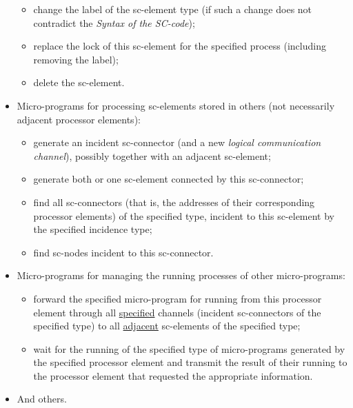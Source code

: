 \documentclass{article}
\begin{document}
\begin{multicols}{2}
\begin{itemize}
\begin{itemize}
			\item change the label of the sc-element type (if such a change does not contradict the \textit{Syntax of the SC-code});
			
			\item replace the lock of this sc-element for the specified	process (including removing the label);
			
			\item delete the sc-element.
		\end{itemize}
		
		\item Micro-programs for processing sc-elements stored in others (not necessarily adjacent processor elements):
		
		\begin{itemize}
			\item generate an incident sc-connector (and a new \textit{logical communication channel}), possibly together with an adjacent sc-element;
			
			\item generate both or one sc-element connected by this sc-connector;
			
			\item find all sc-connectors (that is, the addresses of their corresponding processor elements) of the specified type, incident to this sc-element by the specified incidence type;
			
			\item find sc-nodes incident to this sc-connector.
		\end{itemize}
		
		\item Micro-programs for managing the running processes of other micro-programs:
		
		\begin{itemize}
			\item forward the specified micro-program for running from this processor element through all \uline{specified} channels (incident sc-connectors of the specified type) to all \uline{adjacent} sc-elements of the specified type;
			
			\item wait for the running of the specified type of micro-programs generated by the specified processor element and transmit the result of their running to the processor element that requested the appropriate information.
		\end{itemize}
		
		\item And others.
	\end{itemize}


\end{multicols}
\end{document}
